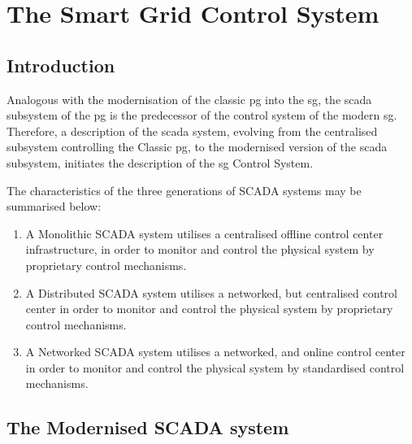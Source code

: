
\section{The Smart Grid Control System}


\subsection{Introduction}

Analogous with the modernisation of the classic \acrlong{pg} into the \acrlong{sg}, the \acrshort{scada} subsystem of the \acrshort{pg} is the predecessor of the control system of the modern \acrlong{sg}.
Therefore, a description of the \acrshort{scada} system, evolving from the centralised subsystem controlling the Classic \acrshort{pg}, to the modernised version of the \acrshort{scada} subsystem, initiates the description of the \acrlong{sg} Control System. 




The characteristics of the three generations of SCADA systems%
may be summarised below:
 

 \begin{enumerate}
     \item A Monolithic SCADA system utilises a centralised offline control center  infrastructure, in order to monitor and control the physical system by proprietary control mechanisms.
     \item A Distributed SCADA system utilises a networked, but centralised control  center in order to monitor and control the physical system by proprietary control mechanisms. 
     \item A Networked SCADA system utilises a networked, and online control  center in order to monitor and control the physical system by standardised control mechanisms.
 \end{enumerate}







\subsection{The Modernised SCADA system}
 
